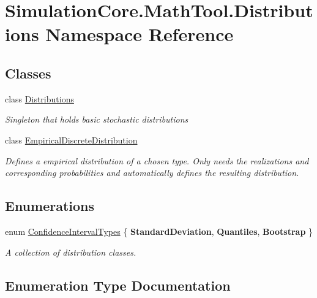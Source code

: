 \hypertarget{namespace_simulation_core_1_1_math_tool_1_1_distributions}{}\section{Simulation\+Core.\+Math\+Tool.\+Distributions Namespace Reference}
\label{namespace_simulation_core_1_1_math_tool_1_1_distributions}
\subsection*{Classes}
\begin{DoxyCompactItemize}
\item 
class \hyperlink{class_simulation_core_1_1_math_tool_1_1_distributions_1_1_distributions}{Distributions}
\begin{DoxyCompactList}\small\item\em Singleton that holds basic stochastic distributions \end{DoxyCompactList}\item 
class \hyperlink{class_simulation_core_1_1_math_tool_1_1_distributions_1_1_empirical_discrete_distribution}{Empirical\+Discrete\+Distribution}
\begin{DoxyCompactList}\small\item\em Defines a empirical distribution of a chosen type. Only needs the realizations and corresponding probabilities and automatically defines the resulting distribution. \end{DoxyCompactList}\end{DoxyCompactItemize}
\subsection*{Enumerations}
\begin{DoxyCompactItemize}
\item 
enum \hyperlink{namespace_simulation_core_1_1_math_tool_1_1_distributions_a4c9ae1b703094a62fce6e2b2415e1122}{Confidence\+Interval\+Types} \{ {\bfseries Standard\+Deviation}, 
{\bfseries Quantiles}, 
{\bfseries Bootstrap}
 \}\begin{DoxyCompactList}\small\item\em A collection of distribution classes. \end{DoxyCompactList}
\end{DoxyCompactItemize}


\subsection{Enumeration Type Documentation}
